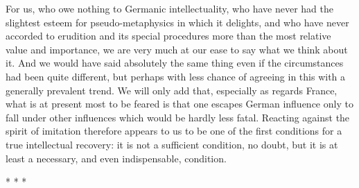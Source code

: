 For us, who owe nothing to Germanic intellectuality, who have never had the slightest esteem for pseudo-metaphysics in which it delights, and who have never accorded to erudition and its special procedures more than the most relative value and importance, we are very much at our ease to say what we think about it. And we would have said absolutely the same thing even if the circumstances had been quite different, but perhaps with less chance of agreeing in this with a generally prevalent trend. We will only add that, especially as regards France, what is at present most to be feared is that one escapes German influence only to fall under other influences which would be hardly less fatal. Reacting against the spirit of imitation therefore appears to us to be one of the first conditions for a true intellectual recovery: it is not a sufficient condition, no doubt, but it is at least a necessary, and even indispensable, condition.




\begin{center}* * *\end{center}

